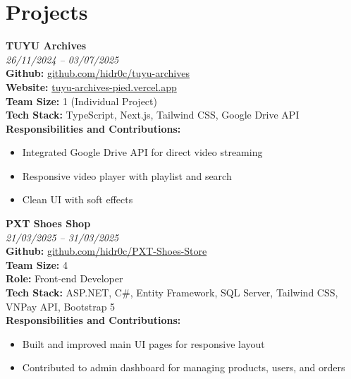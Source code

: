 \documentclass[a4paper,11pt]{article}
\begin{document}
\section{Projects}
\begin{minipage}[t]{\linewidth}
  \textbf{TUYU Archives} \\
  \small\textit{26/11/2024 – 03/07/2025} \\
  \textbf{Github:} \href{https://github.com/hidr0c/tuyu-archives}{github.com/hidr0c/tuyu-archives} \\
  \textbf{Website:} \href{https://tuyu-archives-pied.vercel.app}{tuyu-archives-pied.vercel.app} \\
  \textbf{Team Size:} 1 (Individual Project) \\
  \textbf{Tech Stack:} TypeScript, Next.js, Tailwind CSS, Google Drive API \\
  \textbf{Responsibilities and Contributions: }
  \begin{itemize}[nosep,leftmargin=1.2em,itemsep=2pt]
    \item Integrated Google Drive API for direct video streaming
    \item Responsive video player with playlist and search
    \item Clean UI with soft effects
  \end{itemize}
\end{minipage}

\vspace{0.5em}

\begin{minipage}[t]{\linewidth}
  \textbf{PXT Shoes Shop} \\
  \small\textit{21/03/2025 – 31/03/2025} \\
  \textbf{Github:} \href{https://github.com/hidr0c/PXT-Shoes-Store}{github.com/hidr0c/PXT-Shoes-Store} \\
  \textbf{Team Size:} 4 \\
  \textbf{Role:} Front-end Developer \\
  \textbf{Tech Stack:} ASP.NET, C\#, Entity Framework, SQL Server, Tailwind CSS, VNPay API, Bootstrap 5 \\
  \textbf{Responsibilities and Contributions:}
  \begin{itemize}[nosep,leftmargin=1.2em,itemsep=2pt]
    \item Built and improved main UI pages for responsive layout
    \item Contributed to admin dashboard for managing products, users, and orders
  \end{itemize}
\end{minipage}
\end{document}
